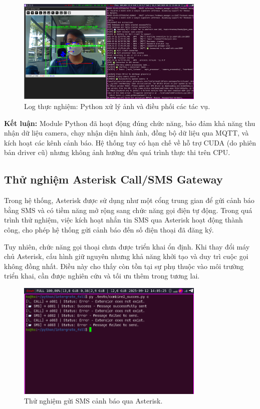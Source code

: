 \begin{figure}[H]
    \centering
    \includegraphics[width=0.8\textwidth]{figures/python_runing_log.png}
    \caption{Log thực nghiệm: Python xử lý ảnh và điều phối các tác vụ.}
    \label{fig:python_runing_log}
\end{figure}

\textbf{Kết luận:} Module Python đã hoạt động đúng chức năng, bảo đảm khả năng thu nhận dữ liệu camera, chạy nhận diện hình ảnh, đồng bộ dữ liệu qua MQTT, và kích hoạt các kênh cảnh báo. Hệ thống tuy có hạn chế về hỗ trợ CUDA (do phiên bản driver cũ) nhưng không ảnh hưởng đến quá trình thực thi trên CPU.

\subsection{Thử nghiệm Asterisk Call/SMS Gateway}
\label{sec:asterisk_test}

Trong hệ thống, Asterisk được sử dụng như một cổng trung gian để gửi cảnh báo bằng SMS và có tiềm năng mở rộng sang chức năng gọi điện tự động.  
Trong quá trình thử nghiệm, việc kích hoạt nhắn tin SMS qua Asterisk hoạt động thành công, cho phép hệ thống gửi cảnh báo đến số điện thoại đã đăng ký.  

Tuy nhiên, chức năng gọi thoại chưa được triển khai ổn định. Khi thay đổi máy chủ Asterisk, cấu hình giữ nguyên nhưng khả năng khởi tạo và duy trì cuộc gọi không đồng nhất. Điều này cho thấy còn tồn tại sự phụ thuộc vào môi trường triển khai, cần được nghiên cứu và tối ưu thêm trong tương lai.  

\begin{figure}[H]
    \centering
    \includegraphics[width=0.8\textwidth]{figures/ast_call_sms_test.png}
    \caption{Thử nghiệm gửi SMS cảnh báo qua Asterisk.}
    \label{fig:ast_call_sms_test}
\end{figure}

